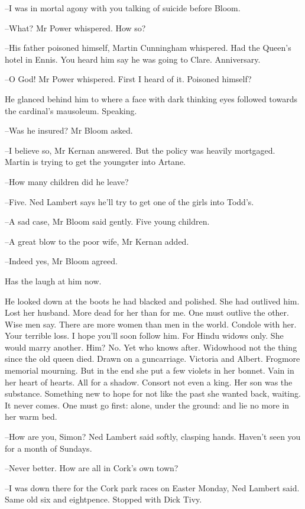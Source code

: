 --I was in mortal agony with you talking of suicide before Bloom.

--What?
Mr Power whispered.
How so?

--His father poisoned himself,
Martin Cunningham whispered.
Had the Queen's hotel in Ennis.
You heard him say he was going to Clare.
Anniversary.

--O God!
Mr Power whispered.
First I heard of it.
Poisoned himself?

He glanced behind him to where
a face with dark thinking eyes followed towards the cardinal's mausoleum.
Speaking.

--Was he insured?
Mr Bloom asked.

--I believe so,
Mr Kernan answered.
But the policy was heavily mortgaged.
Martin is trying to get the youngster into Artane.

--How many children did he leave?

--Five.
Ned Lambert says he'll try to get one of the girls into Todd's.

--A sad case,
Mr Bloom said gently.
Five young children.

--A great blow to the poor wife,
Mr Kernan added.

--Indeed yes,
Mr Bloom agreed.

Has the laugh at him now.

He looked down at the boots he had blacked and polished.
She had outlived him.
Lost her husband.
More dead for her than for me.
One must outlive the other.
Wise men say.
There are more women than men in the world.
Condole with her.
Your terrible loss.
I hope you'll soon follow him.
For Hindu widows only.
She would marry another.
Him?
No.
Yet who knows after.
Widowhood not the thing since the old queen died.
Drawn on a guncarriage.
Victoria and Albert.
Frogmore memorial mourning.
But in the end she put a few violets in her bonnet.
Vain in her heart of hearts.
All for a shadow.
Consort not even a king.
Her son was the substance.
Something new to hope for not like the past she wanted back, waiting.
It never comes.
One must go first:
alone, under the ground:
and lie no more in her warm bed.

--How are you, Simon?
Ned Lambert said softly,
clasping hands.
Haven't seen you for a month of Sundays.

--Never better.
How are all in Cork's own town?

--I was down there for the Cork park races on Easter Monday,
Ned Lambert said.
Same old six and eightpence.
Stopped with Dick Tivy.


